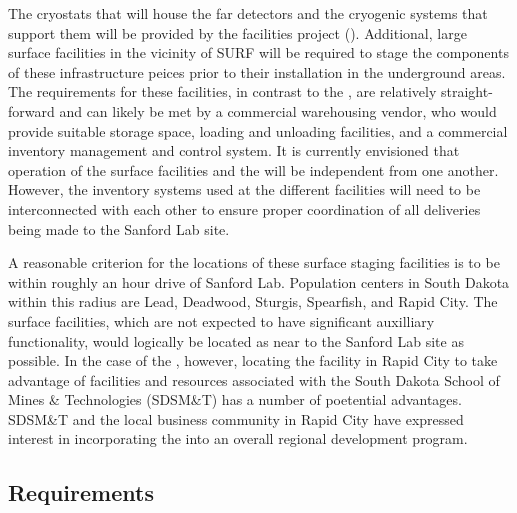 The cryostats that will house the far detectors and the cryogenic
systems that support them will be provided by the facilities project
().  Additional, large surface facilities in the vicinity
of SURF will be required to stage the components of these
infrastructure peices prior to their installation in the underground
areas.  The requirements for these facilities, in contrast to the
, are relatively straight-forward and can likely be met by
a commercial warehousing vendor, who would provide suitable storage
space, loading and unloading facilities, and a commercial inventory
management and control system.  It is currently envisioned that
operation of the  surface facilities and the 
 will be independent from one another.  However, the
inventory systems used at the different facilities will need to be
interconnected with each other to ensure proper coordination of all
deliveries being made to the Sanford Lab site.

A reasonable criterion for the locations of these surface staging
facilities is to be within roughly an hour drive of Sanford Lab.
Population centers in South Dakota within this radius are Lead,
Deadwood, Sturgis, Spearfish, and Rapid City.  The 
surface facilities, which are not expected to have significant
auxilliary functionality, would logically be located as near to the
Sanford Lab site as possible.  In the case of the 
, however, locating the facility in Rapid City to take
advantage of facilities and resources associated with the South Dakota
School of Mines \& Technologies (SDSM\&T) has a number of poetential
advantages.  SDSM\&T and the local business community in Rapid City
have expressed interest in incorporating the  
into an overall regional development program.

\subsection{Requirements}

